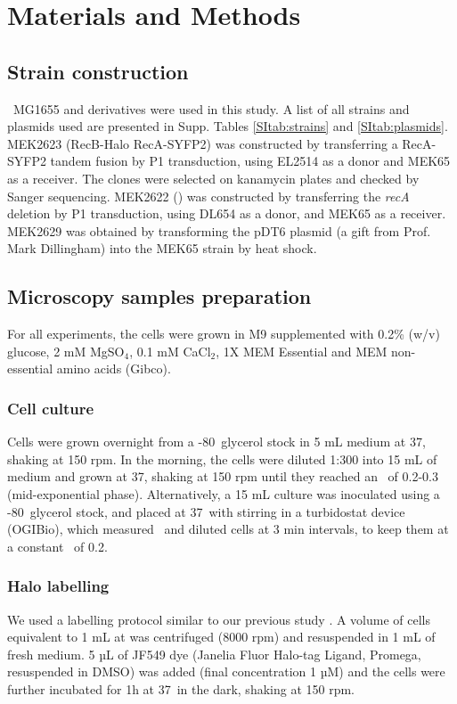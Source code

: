 \section*{Materials and Methods}

\subsection*{Strain construction}
\ecoli\ MG1655 and derivatives were used in this study. A list of all strains and plasmids used are presented in Supp. Tables \ref{SItab:strains} and \ref{SItab:plasmids}.
MEK2623 (RecB-Halo RecA-SYFP2) was constructed by transferring a RecA-SYFP2 tandem fusion by P1 transduction, using EL2514 \cite{Wiktor2021} as a donor and MEK65 \cite{Lepore2019a} as a receiver. The clones were selected on kanamycin plates and checked by Sanger sequencing. MEK2622 (\dreca) was constructed by transferring the \emph{recA} deletion by P1 transduction, using DL654 as a donor, and MEK65 as a receiver. MEK2629 was obtained by transforming the pDT6 plasmid (a gift from Prof. Mark Dillingham) into the MEK65 strain by heat shock.

\subsection*{Microscopy samples preparation}
For all experiments, the cells were grown in M9 supplemented with 0.2\% (w/v) glucose, 2 mM MgSO$_4$, 0.1 mM CaCl$_2$, 1X MEM Essential and MEM non-essential amino acids (Gibco).
\subsubsection*{Cell culture}
Cells were grown overnight from a -80\celsius\ glycerol stock in 5 mL medium at 37\celsius, shaking at 150 rpm. In the morning, the cells were diluted 1:300 into 15 mL of medium and grown at 37\celsius, shaking at 150 rpm until they reached an \od\ of 0.2-0.3 (mid-exponential phase).
Alternatively, a 15 mL culture was inoculated using a -80\celsius\ glycerol stock, and placed at 37\celsius\ with stirring in a turbidostat device (OGIBio), which measured \od\ and diluted cells at 3 min intervals, to keep them at a constant \od\ of 0.2.
\subsubsection*{Halo labelling}
We used a labelling protocol similar to our previous study \cite{Lepore2025}. A volume of cells equivalent to 1 mL at  was centrifuged (8000 rpm) and resuspended in 1 mL of fresh medium. 5 µL of JF549 dye (Janelia Fluor Halo-tag Ligand, Promega, resuspended in DMSO) was added (final concentration 1 µM) and the cells were further incubated for 1h at 37\celsius\ in the dark, shaking at 150 rpm.
